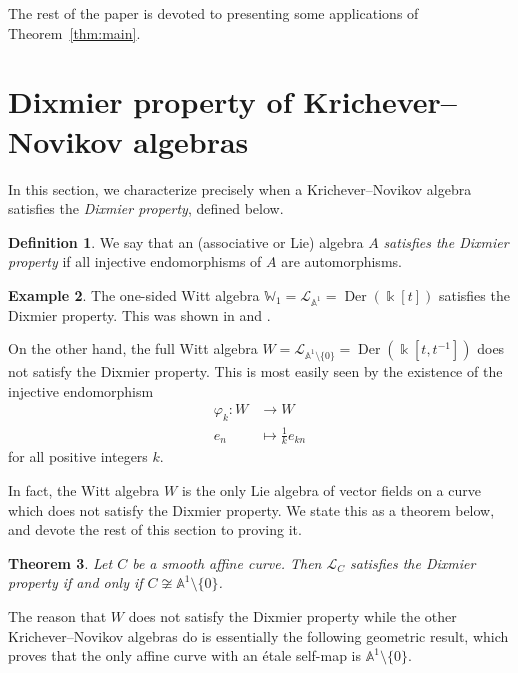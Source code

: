 \documentclass[12pt]{amsart}
\theoremstyle{plain}
\newtheorem{theorem}{Theorem}[section]
\theoremstyle{definition}
\newtheorem{definition}[theorem]{Definition}
\newtheorem{example}[theorem]{Example}
\numberwithin{equation}{section}
\def\L{\mathcal{L}}
\def\Aa{\mathbb{A}}
\def\WW{\mathbb{W}}
\def\kk{\Bbbk}
\DeclareMathOperator{\Der}{Der}
\def\nonzero{\setminus \{0\}}
\begin{document}
The rest of the paper is devoted to presenting some applications of Theorem~\ref{thm:main}.

\section{Dixmier property of Krichever--Novikov algebras}\label{sec:Dixmier}

In this section, we characterize precisely when a Krichever--Novikov algebra satisfies the \emph{Dixmier property}, defined below.

\begin{definition}\label{def:Dixmier}
    We say that an (associative or Lie) algebra $A$ \emph{satisfies the Dixmier property} if all injective endomorphisms of $A$ are automorphisms.
\end{definition}

\begin{example}\label{ex:Dixmier}
    The one-sided Witt algebra $\WW_1 = \L_{\Aa^1} = \Der(\kk[t])$ satisfies the Dixmier property. This was shown in \cite{Du} and \cite[Corollary 4.4]{BellBuzaglo}.

    On the other hand, the full Witt algebra $W = \L_{\Aa^1 \setminus \{0\}} = \Der(\kk[t,t^{-1}])$ does not satisfy the Dixmier property. This is most easily seen by the existence of the injective endomorphism
    \begin{align*}
        \varphi_k \colon W &\to W \\
        e_n &\mapsto \frac{1}{k} e_{kn}
    \end{align*}
    for all positive integers $k$.
\end{example}

In fact, the Witt algebra $W$ is the only Lie algebra of vector fields on a curve which does not satisfy the Dixmier property. We state this as a theorem below, and devote the rest of this section to proving it.

\begin{theorem}\label{thm:Dixmier}
    Let $C$ be a smooth affine curve. Then $\L_C$ satisfies the Dixmier property if and only if $C \not\cong \Aa^1 \nonzero$.
\end{theorem}

The reason that $W$ does not satisfy the Dixmier property while the other Krichever--Novikov algebras do is essentially the following geometric result, which proves that the only affine curve with an \'etale self-map is $\Aa^1 \nonzero$.
\end{document}
